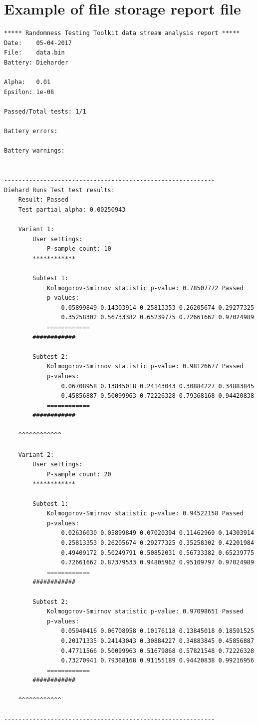 \documentclass[
  digital,  	%
  color,		%
  oneside,   	%
  12pt,
  nocover,
  notable,
  nolof,
  nolot,
]{fithesis3}
\begin{document}
\chapter{Example of file storage report file}
\label{app:file_storage_report}
\begin{verbatim}
***** Randomness Testing Toolkit data stream analysis report *****
Date:    05-04-2017
File:    data.bin
Battery: Dieharder

Alpha:   0.01
Epsilon: 1e-08

Passed/Total tests: 1/1

Battery errors:

Battery warnings:


-----------------------------------------------------------
Diehard Runs Test test results:
    Result: Passed
    Test partial alpha: 0.00250943

    Variant 1:
        User settings: 
            P-sample count: 10
        ************

        Subtest 1:
            Kolmogorov-Smirnov statistic p-value: 0.78507772 Passed
            p-values: 
                0.05899849 0.14303914 0.25813353 0.26205674 0.29277325 
                0.35258302 0.56733382 0.65239775 0.72661662 0.97024989 
            ============
        ############

        Subtest 2:
            Kolmogorov-Smirnov statistic p-value: 0.98126677 Passed
            p-values: 
                0.06708958 0.13845018 0.24143043 0.30884227 0.34883845 
                0.45856887 0.50099963 0.72226328 0.79368168 0.94420838 
            ============
        ############

    ^^^^^^^^^^^^

    Variant 2:
        User settings: 
            P-sample count: 20
        ************

        Subtest 1:
            Kolmogorov-Smirnov statistic p-value: 0.94522158 Passed
            p-values: 
                0.02636030 0.05899849 0.07020394 0.11462969 0.14303914 
                0.25813353 0.26205674 0.29277325 0.35258302 0.42201984 
                0.49409172 0.50249791 0.50852031 0.56733382 0.65239775 
                0.72661662 0.87379533 0.94805962 0.95109797 0.97024989 
            ============
        ############

        Subtest 2:
            Kolmogorov-Smirnov statistic p-value: 0.97098651 Passed
            p-values: 
                0.05940416 0.06708958 0.10176118 0.13845018 0.18591525 
                0.20171335 0.24143043 0.30884227 0.34883845 0.45856887 
                0.47711566 0.50099963 0.51679868 0.57821548 0.72226328 
                0.73270941 0.79368168 0.91155189 0.94420838 0.99216956 
            ============
        ############

    ^^^^^^^^^^^^

-----------------------------------------------------------
\end{verbatim}
\end{document}
